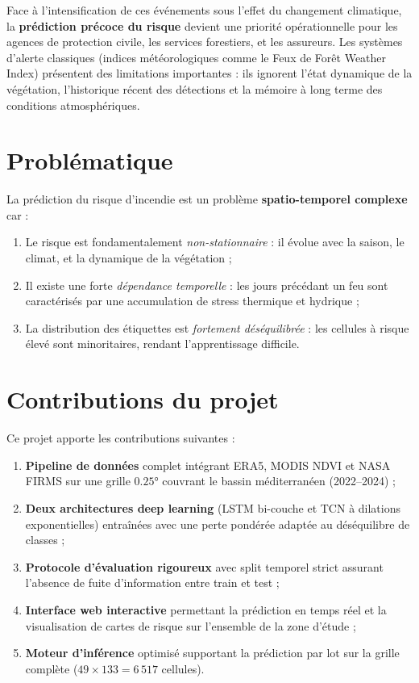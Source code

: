 \documentclass[12pt,a4paper]{report}
\begin{document}
Face à l'intensification de ces événements sous l'effet du changement climatique, la
\textbf{prédiction précoce du risque} devient une priorité opérationnelle pour les agences
de protection civile, les services forestiers, et les assureurs. Les systèmes d'alerte
classiques (indices météorologiques comme le Feux de Forêt Weather Index) présentent des
limitations importantes : ils ignorent l'état dynamique de la végétation, l'historique
récent des détections et la mémoire à long terme des conditions atmosphériques.

\section{Problématique}

La prédiction du risque d'incendie est un problème \textbf{spatio-temporel complexe} car :
\begin{enumerate}[leftmargin=*]
  \item Le risque est fondamentalement \emph{non-stationnaire} : il évolue avec la saison,
        le climat, et la dynamique de la végétation ;
  \item Il existe une forte \emph{dépendance temporelle} : les jours précédant un feu sont
        caractérisés par une accumulation de stress thermique et hydrique ;
  \item La distribution des étiquettes est \emph{fortement déséquilibrée} : les cellules
        à risque élevé sont minoritaires, rendant l'apprentissage difficile.
\end{enumerate}

\section{Contributions du projet}

Ce projet apporte les contributions suivantes :

\begin{firebox}[title=Contributions principales]
\begin{enumerate}[leftmargin=*,itemsep=4pt]
  \item \textbf{Pipeline de données} complet intégrant ERA5, MODIS NDVI et NASA FIRMS
        sur une grille $0.25°$ couvrant le bassin méditerranéen (2022–2024) ;
  \item \textbf{Deux architectures deep learning} (LSTM bi-couche et TCN à dilations
        exponentielles) entraînées avec une perte pondérée adaptée au déséquilibre
        de classes ;
  \item \textbf{Protocole d'évaluation rigoureux} avec split temporel strict assurant
        l'absence de fuite d'information entre train et test ;
  \item \textbf{Interface web interactive} permettant la prédiction en temps réel et
        la visualisation de cartes de risque sur l'ensemble de la zone d'étude ;
  \item \textbf{Moteur d'inférence} optimisé supportant la prédiction par lot sur la
        grille complète ($49 \times 133 = 6\,517$ cellules).
\end{enumerate}
\end{firebox}
\end{document}
